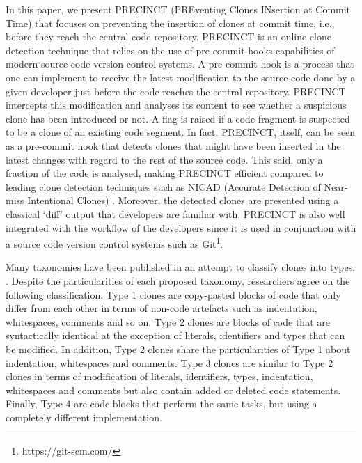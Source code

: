 \documentclass[conference]{IEEEtran}
\begin{document}
In this paper, we present PRECINCT (PREventing Clones INsertion at Commit Time) that focuses on preventing the insertion of clones at commit time, i.e., before they reach the central code repository. PRECINCT is an online clone detection technique that relies on the use of pre-commit hooks capabilities of modern source code version control systems. A pre-commit hook is a process that one can implement to receive the latest modification to the source code done by a given developer just before the code reaches the central repository.
PRECINCT intercepts this modification and analyses its  content to see whether a suspicious clone has been introduced or not.
A flag is raised if a code fragment is suspected to be a clone of an existing code segment.
In fact, PRECINCT, itself, can be seen as a pre-commit hook that detects clones that might have been inserted in the latest changes with regard to the rest of the source code.
This said, only a fraction of the code is analysed, making PRECINCT efficient compared to leading  clone detection techniques such as NICAD (Accurate Detection of Near-miss Intentional Clones) \cite{Cordy2011}.
Moreover, the detected clones are presented using a classical `diff' output that developers are familiar with.
PRECINCT is also well integrated with the workflow of the developers since it is used in conjunction with a source code version control systems such as Git\footnote{https://git-scm.com/}.


Many taxonomies have been published in an attempt to classify clones into types. \cite{Mayrand1996,Balazinska1999,Koschke2006,Bellon2007,Kontogiannis,Kapser}.
Despite the particularities of each proposed taxonomy, researchers agree on the following classification.
Type 1 clones are copy-pasted blocks of code that only differ from each other in terms of non-code artefacts such as indentation, whitespaces, comments and so on.
Type 2 clones are blocks of code that are syntactically identical at the exception of literals, identifiers and types that can be modified.
In addition, Type 2 clones share the particularities of Type 1 about indentation, whitespaces and comments.
Type 3 clones are similar to Type 2 clones in terms of modification of literals, identifiers, types, indentation, whitespaces and comments but also contain added or deleted code statements.
Finally, Type 4 are code blocks that perform the same tasks, but using a completely different implementation.
\end{document}

